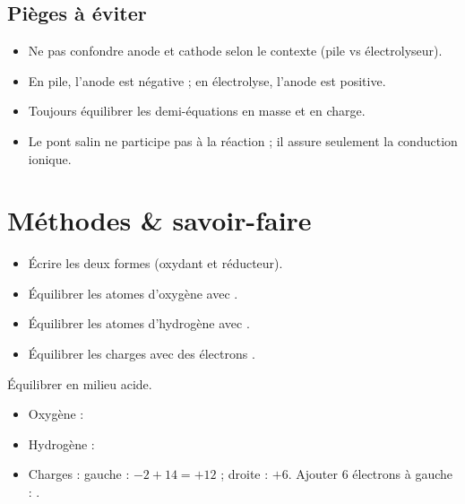 \begin{synthese}
\subsection*{Pièges à éviter}
\begin{itemize}
    \item Ne pas confondre anode et cathode selon le contexte (pile vs électrolyseur).
    \item En pile, l'anode est négative ; en électrolyse, l'anode est positive.
    \item Toujours équilibrer les demi-équations en masse et en charge.
    \item Le pont salin ne participe pas à la réaction ; il assure seulement la conduction ionique.
\end{itemize}
\end{synthese}

\section{Méthodes \& savoir-faire}

\begin{itemize}
    \item Écrire les deux formes (oxydant et réducteur).
    \item Équilibrer les atomes d'oxygène avec .
    \item Équilibrer les atomes d'hydrogène avec .
    \item Équilibrer les charges avec des électrons .
\end{itemize}
\begin{exemple}
Équilibrer  en milieu acide.
\begin{itemize}
    \item Oxygène : 
    \item Hydrogène : 
    \item Charges : gauche : $-2 + 14 = +12$ ; droite : $+6$. Ajouter $6$ électrons à gauche : .
\end{itemize}
\end{exemple}

